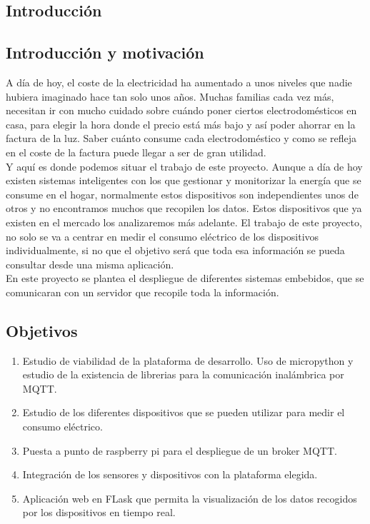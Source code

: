 \begin{titlepage}

\chapter{Introducción}
\section{Introducción y motivación}
A día de hoy, el coste de la electricidad ha aumentado a unos niveles que nadie hubiera imaginado hace tan solo unos años. Muchas familias cada vez más, necesitan ir con mucho cuidado sobre cuándo poner ciertos electrodomésticos en casa, para elegir la hora donde el precio está más bajo y así poder ahorrar en la factura de la luz. Saber cuánto consume cada electrodoméstico y como se refleja en el coste de la factura puede llegar a ser de gran utilidad. \\

Y aquí es donde podemos situar el trabajo de este proyecto. Aunque a día de hoy existen sistemas inteligentes con los que gestionar y monitorizar la energía que se consume en el hogar, normalmente estos dispositivos son independientes unos de otros y no encontramos muchos que recopilen los datos. Estos dispositivos que ya existen en el mercado los analizaremos más adelante. El trabajo de este proyecto, no solo se va a centrar en medir el consumo eléctrico de los dispositivos individualmente, si no que el objetivo será que toda esa información se pueda consultar desde una misma aplicación. \\

En este proyecto se plantea el despliegue de diferentes sistemas embebidos, que se comunicaran con un servidor que recopile toda la información.\\

\section{Objetivos}

\begin{enumerate}
\item Estudio de viabilidad de la plataforma de desarrollo. Uso de micropython y estudio de la existencia de librerias para la comunicación inalámbrica por MQTT.
\item Estudio de los diferentes dispositivos que se pueden utilizar para medir el consumo eléctrico. 
\item Puesta a punto de raspberry pi para el despliegue de un broker MQTT.
\item Integración de los sensores y dispositivos con la plataforma elegida.
\item Aplicación web en FLask que permita la visualización de los datos recogidos por los dispositivos en tiempo real.
\end{enumerate}


\end{titlepage}

